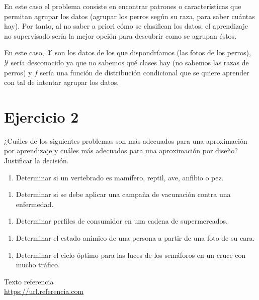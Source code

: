 \documentclass[11pt,a4paper]{article}
\begin{document}
En este caso el problema consiste en encontrar patrones o características que permitan agrupar los datos (agrupar los perros
según su raza, para saber cuántas hay). Por tanto, al no saber a priori cómo se clasifican los datos, el aprendizaje no
supervisado sería la mejor opción para descubrir como se agrupan éstos.

En este caso, $\mathcal{X}$ son los datos de los que dispondríamos (las fotos de los perros), $\mathcal{Y}$ sería desconocido
ya que no sabemos qué clases hay (no sabemos las razas de perros) y $f$ sería una función de distribución condicional que se
quiere aprender con tal de intentar agrupar los datos.

\section*{Ejercicio 2}

\noindent ¿Cuáles de los siguientes problemas son más adecuados para una aproximación por aprendizaje y cuáles más adecuados
para una aproximación por diseño? Justificar la decisión.

\begin{enumerate}[label=\textit{\alph*})]
	\item Determinar si un vertebrado es mamífero, reptil, ave, anfibio o pez.
\end{enumerate}

\begin{enumerate}[resume,label=\textit{\alph*})]
	\item Determinar si se debe aplicar una campaña de vacunación contra una enfermedad.
\end{enumerate}

\begin{enumerate}[resume,label=\textit{\alph*})]
	\item Determinar perfiles de consumidor en una cadena de supermercados.
\end{enumerate}

\begin{enumerate}[resume,label=\textit{\alph*})]
	\item Determinar el estado anímico de una persona a partir de una foto de su cara.
\end{enumerate}

\begin{enumerate}[resume,label=\textit{\alph*})]
	\item Determinar el ciclo óptimo para las luces de los semáforos en un cruce con mucho tráfico.
\end{enumerate}



\newpage

\begin{thebibliography}{5}

Texto referencia
\\\url{https://url.referencia.com}

\end{thebibliography}
\end{document}
